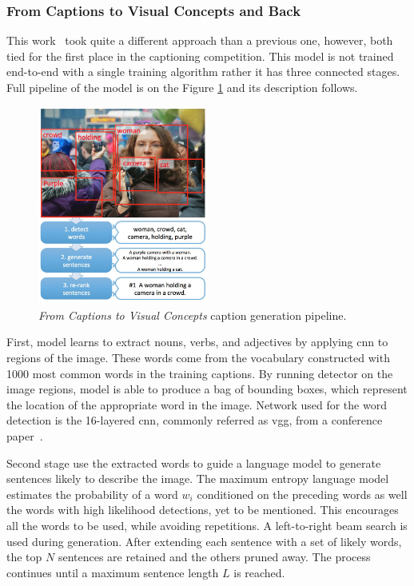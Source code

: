 \subsubsection{From Captions to Visual Concepts and Back}

This work~\cite{DBLP:journals/corr/FangGISDDGHMPZZ14} took quite a different approach than a previous one, however, both tied for the first place in the captioning competition. This model is not trained end-to-end with a single training algorithm rather it has three connected stages. Full pipeline of the model is on the Figure \ref{fig:fromCaptionsModel} and its description follows.

\begin{figure}[!t]
	\centering
	\includegraphics[width=0.5\textwidth]{./fig/from-captions-workflow.png}
	\caption{\emph{From Captions to Visual Concepts} caption generation pipeline.~\cite{DBLP:journals/corr/FangGISDDGHMPZZ14}
		\label{fig:fromCaptionsModel}}
\end{figure}

First, model learns to extract nouns, verbs, and adjectives by applying \gls{cnn} to regions of the image. These words come from the vocabulary constructed with 1000 most common words in the training captions. By running detector on the image regions, model is able to produce a bag of bounding boxes, which represent the location of the appropriate word in the image. Network used for the word detection is the 16-layered \gls{cnn}, commonly referred as \gls{vgg}, from a conference paper~\cite{DBLP:journals/corr/SimonyanZ14a}.

Second stage use the extracted words to guide a language model to generate sentences likely  to describe the image. The maximum entropy language model estimates the probability of a word $ w_i $ conditioned on the preceding words as well the words with high likelihood detections, yet to be mentioned. This encourages all the words to be used, while avoiding repetitions. A left-to-right beam search is used during generation. After extending each sentence with a set of likely words, the top $ N $  sentences are retained and the others pruned away. The process continues until a maximum sentence length $ L $ is reached.

